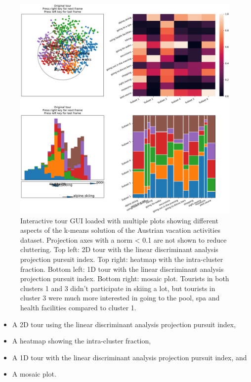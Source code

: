 \documentclass[article]{ajs}
\begin{document}
\begin{figure}[h!]
    \centering
    \includegraphics[width=1\textwidth]{winter_cl7_init.png}
    \caption{Interactive tour GUI loaded with multiple plots showing different aspects of the k-means solution of the Austrian vacation activities dataset. Projection axes with a norm < 0.1 are not shown to reduce cluttering. Top left: 2D tour with the linear discriminant analysis projection pursuit index. Top right: heatmap with the intra-cluster fraction. Bottom left: 1D tour with the linear discriminant analysis projection pursuit index. Bottom right: mosaic plot. Tourists in both clusters 1 and 3 didn't participate in skiing a lot, but tourists in cluster 3 were much more interested in going to the pool, spa and health facilities compared to cluster 1.}
    \label{fig:winter_cl7_init}
\end{figure}

\begin{itemize}
    \item A 2D tour using the linear discriminant analysis projection pursuit index,
    \item A heatmap showing the intra-cluster fraction,
    \item A 1D tour with the linear discriminant analysis projection pursuit index, and
    \item A mosaic plot.
\end{itemize}
\end{document}
